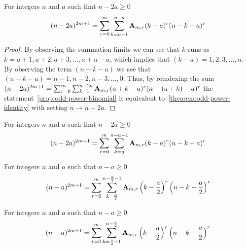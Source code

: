\begin{proposition}
    \label{prop:odd-power-binomial}
    For integers $n$ and $a$ such that $n-2a \geq 0$
    \begin{align*}
    (n-2a)^{2m+1} = \sum_{r=0}^{m} \sum_{k=a+1}^{n-a} {\mathbf{A}} \sb{m,r} (k-a)^r (n-k-a)^r
    \end{align*}
    \begin{proof}
        By observing the summation limits we can see that $k$ runs as $k=a+1,a+2,a+3,\ldots,a+n-a$, which
        implies that $(k-a)=1,2,3,\ldots, n$.
        By observing the term $(n-k-a)$ we see that $(n-k-a)=n-1,n-2,n-3,\ldots,0$.
        Thus, by reindexing the sum
        $(n-2a)^{2m+1} = \sum_{r=0}^{m} \sum_{k=1}^{n-2a} {\mathbf{A}} \sb{m,r} (a+k-a)^r (n-(a+k)-a)^r$
        the statement~\eqref{prop:odd-power-binomial} is equivalent to~\eqref{theorem:odd-power-identity}
        with setting $n \rightarrow n-2a$.
    \end{proof}
\end{proposition}

\begin{corollary}
    \label{prop:odd-power-binomial-shifted}
    For integers $n$ and $a$ such that $n-2a \geq 0$
    \begin{align*}
    (n-2a)^{2m+1} = \sum_{r=0}^{m} \sum_{k=a}^{n-a-1} {\mathbf{A}} \sb{m,r} (k-a)^r (n-k-a)^r
    \end{align*}
\end{corollary}

\begin{corollary}
    \label{cor:odd-power-binomial-symmetric}
    For integers $n$ and $a$ such that $n-a \geq 0$
    \begin{align*}
    (n-a)^{2m+1} = \sum_{r=0}^{m} \sum_{k=\frac{a}{2}}^{n-\frac{a}{2}-1} {\mathbf{A}} \sb{m,r} \left( k-\frac{a}{2} \right)^r \left(n-k-\frac{a}{2} \right)^r
    \end{align*}
\end{corollary}

\begin{corollary}
    \label{cor:odd-power-binomial-symmetric-shifted}
    For integers $n$ and $a$ such that $n-a \geq 0$
    \begin{align*}
    (n-a)^{2m+1} = \sum_{r=0}^{m} \sum_{k=\frac{a}{2}+1}^{n-\frac{a}{2}} {\mathbf{A}} \sb{m,r} \left( k-\frac{a}{2} \right)^r \left(n-k-\frac{a}{2} \right)^r
    \end{align*}
\end{corollary}
